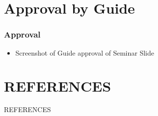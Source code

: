 \documentclass[c]{beamer}
\begin{document}
\section{Approval by Guide}
\begin{frame} [c]
    \frametitle{Approval}
    \begin{itemize}
    
         \item Screenshot of Guide approval of Seminar Slide
         
    \end{itemize}
\end{frame}
	
\section{REFERENCES}
\begin{frame}[allowframebreaks]{REFERENCES}
\tiny
\nocite{*}
\printbibliography
\end{frame}
	
	
\end{document}

